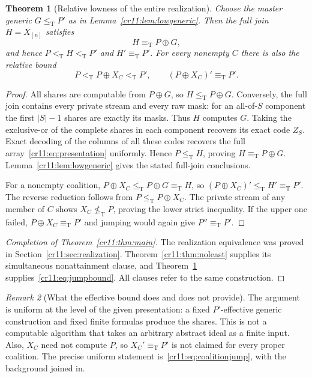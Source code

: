 \documentclass[11pt,letterpaper]{article}
\theoremstyle{plain}
\newtheorem{theorem}{Theorem}[section]
\theoremstyle{definition}
\theoremstyle{remark}
\newtheorem{remark}[theorem]{Remark}
\numberwithin{equation}{section}
\newcommand{\leT}{\leq_{\mathrm T}}
\newcommand{\ltT}{<_{\mathrm T}}
\newcommand{\eqT}{\equiv_{\mathrm T}}
\newcommand{\nleT}{\nleq_{\mathrm T}}
\newcommand{\join}{\mathbin{\oplus}}
\begin{document}
\begin{theorem}[Relative lowness of the entire realization]\label{cr11:thm:effective}
Choose the master generic $G\leT P'$ as in Lemma~\ref{cr11:lem:lowgeneric}.
Then the full join $H=X_{[n]}$ satisfies
\[
                    H\eqT P\join G,
\]
and hence $P\ltT H\ltT P'$ and $H'\eqT P'$.
For every nonempty $C$ there is also the relative bound
\begin{equation}\label{cr11:eq:coalitionjump}
 P\ltT P\join X_C\ltT P',\qquad (P\join X_C)'\eqT P'.
\end{equation}
\end{theorem}
\begin{proof}
All shares are computable from $P\join G$, so $H\leT P\join G$.
Conversely, the full join contains every private stream and every raw mask:
for an all-of-$S$ component the first $|S|-1$ shares are exactly its masks.
Thus $H$ computes $G$. Taking the exclusive-or of the complete shares in
each component recovers its exact code $Z_S$. Exact decoding of the columns
of all these codes recovers the full array~\eqref{cr11:eq:presentation}
uniformly. Hence $P\leT H$, proving $H\eqT P\join G$.
Lemma~\ref{cr11:lem:lowgeneric} gives the stated full-join conclusions.

For a nonempty coalition, $P\join X_C\leT P\join G\eqT H$, so
$(P\join X_C)'\leT H'\eqT P'$. The reverse reduction follows from
$P\leT P\join X_C$. The private stream of any member of $C$ shows
$X_C\nleT P$, proving the lower strict inequality. If the upper one failed,
$P\join X_C\eqT P'$ and jumping would again give $P''\eqT P'$.
\end{proof}

\begin{proof}[Completion of Theorem~\ref{cr11:thm:main}]
The realization equivalence was proved in Section~\ref{cr11:sec:realization}.
Theorem~\ref{cr11:thm:noleast} supplies its simultaneous nonattainment clause,
and Theorem~\ref{cr11:thm:effective} supplies~\eqref{cr11:eq:jumpbound}.
All clauses refer to the same construction.
\end{proof}

\begin{remark}[What the effective bound does and does not provide]
The argument is uniform at the level of the given presentation: a fixed
$P'$-effective generic construction and fixed finite formulas produce the
shares. This is not a computable algorithm that takes an arbitrary abstract
ideal as a finite input. Also, $X_C$ need not compute $P$, so
$X_C'\eqT P'$ is not claimed for every proper coalition. The precise
uniform statement is~\eqref{cr11:eq:coalitionjump}, with the background joined in.
\end{remark}
\end{document}

